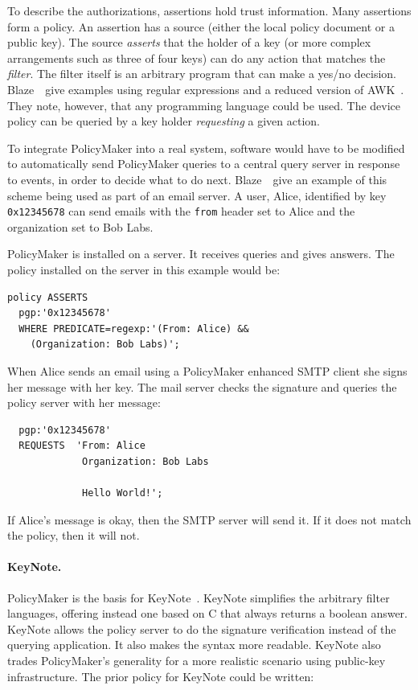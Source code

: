 \documentclass[thesis.tex]{subfiles}
\begin{document}
To describe the authorizations, assertions hold trust information.
Many assertions form a policy. An assertion has a source (either the
local policy document or a public key). The source \emph{asserts} that
the holder of a key (or more complex arrangements such as three of
four keys) can do any action that matches the \emph{filter}. The
filter itself is an arbitrary program that can make a yes/no decision.
Blaze~\etal~give examples using regular expressions and a reduced
version of AWK~\cite{aho_awk-pattern_1979}. They note, however, that
any programming language could be used. The device policy can be
queried by a key holder \emph{requesting} a given action. 

To integrate PolicyMaker into a real system, software would have to be modified
to automatically send PolicyMaker queries to a central query server in response
to events, in order to decide what to do next.
% 
Blaze~\etal~give an example of this scheme being used as part of an
email server. A user, Alice, identified by key \texttt{0x12345678} can
send emails with the \texttt{from} header set to Alice and the
organization set to Bob Labs.

PolicyMaker is installed on a server. It receives queries and gives answers.
The policy installed on the server in this example would be:

\begin{lstlisting}
policy ASSERTS
  pgp:'0x12345678'
  WHERE PREDICATE=regexp:'(From: Alice) &&
    (Organization: Bob Labs)';
\end{lstlisting}

When Alice sends an email using a PolicyMaker enhanced SMTP
client she signs her message with her key.  The mail server
checks the signature and queries the policy server with her message:

\begin{lstlisting}
  pgp:'0x12345678'
  REQUESTS  'From: Alice
             Organization: Bob Labs

             Hello World!';
\end{lstlisting}

If Alice's message is okay, then the SMTP server will send it.  If it does not
match the policy, then it will not.

\paragraph*{KeyNote.}
PolicyMaker is the basis for KeyNote~\cite{blaze_role_1999,blaze_keynote:_1998}.
KeyNote simplifies the arbitrary filter languages, offering instead one based on
C that always returns a boolean answer. KeyNote allows the policy server to do
the signature verification instead of the querying application. It also makes the
syntax more readable. KeyNote also trades PolicyMaker's generality for a more
realistic scenario using public-key infrastructure. The prior policy for KeyNote
could be written:
\end{document}
